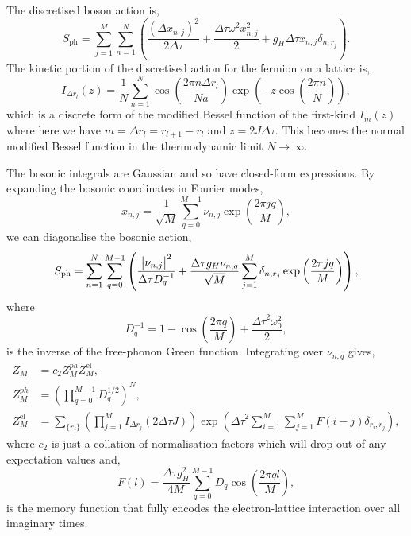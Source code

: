 The discretised boson action is,
\begin{equation}
    S_{\text{ph}} = \sum_{j=1}^M \sum_{n=1}^N \left( \frac{\left( \Delta x_{n,j} \right)^2}{2 \Delta\tau} + \frac{\Delta\tau \omega^2 x^2_{n,j}}{2} + g_H \Delta\tau x_{n,j} \delta_{n,r_j}\right) .
\end{equation}
The kinetic portion of the discretised action for the fermion on a lattice is,
\begin{equation}
    I_{\Delta r_l}(z) = \frac{1}{N} \sum_{n=1}^N \cos\left( \frac{2\pi n \Delta r_l}{Na}  \right) \exp\left(-z \cos\left(\frac{2\pi n}{N}\right)\right) ,
\end{equation}
which is a discrete form of the modified Bessel function of the first-kind $I_m(z)$ \cite[\href{http://dlmf.nist.gov/10.32.E3}{(10.32.3)}]{noauthor_dlmf_nodate} where here we have $m = \Delta r_l = r_{l+1} - r_l$ and $z = 2 J \Delta\tau$. This becomes the normal modified Bessel function in the thermodynamic limit $N \to \infty$.

The bosonic integrals are Gaussian and so have closed-form expressions. By expanding the bosonic coordinates in Fourier modes,
\begin{equation}
    x_{n,j} = \frac{1}{\sqrt{M}} \sum_{q=0}^{M-1} \nu_{n,j} \exp\left( \frac{2\pi j q}{M} \right) ,
\end{equation}
we can diagonalise the bosonic action,
\begin{equation}
    S_{\text{ph}} = \sum_{n=1}^N \sum_{q=0}^{M-1} \left( \frac{\abs{\nu_{n,j}}^2}{\Delta\tau D_q^{-1}} + \frac{\Delta\tau g_H \nu_{n,q}}{\sqrt{M}} \sum_{j=1}^M \delta_{n,r_j} \exp\left(\frac{2\pi j q}{M}\right) \right) ,
\end{equation}
where 
\begin{equation}
    D_q^{-1} = 1 - \cos\left(\frac{2\pi q}{M} \right) + \frac{{\Delta\tau}^2 \omega_0^2}{2} ,
\end{equation}
is the inverse of the free-phonon Green function. Integrating over $\nu_{n,q}$ gives,
\begin{equation}
    \begin{aligned}
        Z_M &= c_2 Z^{ph}_M Z_M^{\text{el}} , \\
        Z^{ph}_M &= \left( \prod_{q=0}^{M-1} D^{1/2}_q \right)^N , \\
        Z^{\text{el}}_M &= \sum_{\{r_j\}} \left( \prod_{j=1}^M I_{\Delta r_j}(2 \Delta\tau J) \right) \exp \left( {\Delta\tau}^2 \sum_{i=1}^M \sum_{j=1}^M F(i - j) \delta_{r_i, r_j} \right) ,
    \end{aligned}
\end{equation}
where $c_2$ is just a collation of normalisation factors which will drop out of any expectation values and,
\begin{equation}
    F(l) = \frac{\Delta\tau g_H^2}{4M} \sum_{q=0}^{M-1} D_q \cos\left(\frac{2\pi q l }{M}\right) ,
\end{equation}
is the memory function that fully encodes the electron-lattice interaction over all imaginary times.

